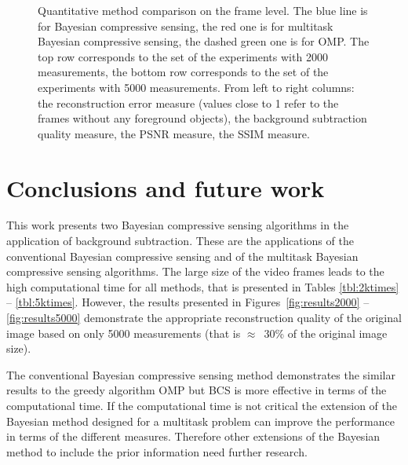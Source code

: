 \documentclass[conference]{IEEEtran}
\begin{document}
\begin{figure*}[ht]
\centering
{}
\hfil
{}
\hfil
{}
\hfil
{}
\hfil
{}
\hfil
{}
\hfil
{}
\hfil
{}
\caption{Quantitative method comparison on the frame level. The blue line is for Bayesian compressive sensing, the red one is for multitask Bayesian compressive sensing, the dashed green one is for OMP. The top row corresponds to the set of the experiments with 2000 measurements, the bottom row corresponds to the set of the experiments with 5000 measurements. From left to right columns: the reconstruction error measure (values close to 1 refer to the frames without any foreground objects), the background subtraction quality measure, the PSNR measure, the SSIM measure.}
\label{fig:frame_comparison}
\end{figure*}

\section{Conclusions and future work}
\label{sec:conclusion}
This work presents two Bayesian compressive sensing algorithms in the application of background subtraction. These are the applications of the conventional Bayesian compressive sensing and of the multitask Bayesian compressive sensing algorithms. The large size of the video frames leads to the high computational time for all methods, that is presented in Tables \ref{tbl:2ktimes} -- \ref{tbl:5ktimes}. However, the results presented in Figures~\ref{fig:results2000} -- \ref{fig:results5000} demonstrate the appropriate reconstruction quality of the original image based on only 5000 measurements (that is $\approx$~30\% of the original image size). 

The conventional Bayesian compressive sensing method demonstrates the similar results to the greedy algorithm OMP but BCS is more effective in terms of the computational time. If the computational time is not critical the extension of the Bayesian method designed for a multitask problem can improve the performance in terms of the different measures. Therefore other extensions of the Bayesian method to include the prior information need further research.   
\end{document}
